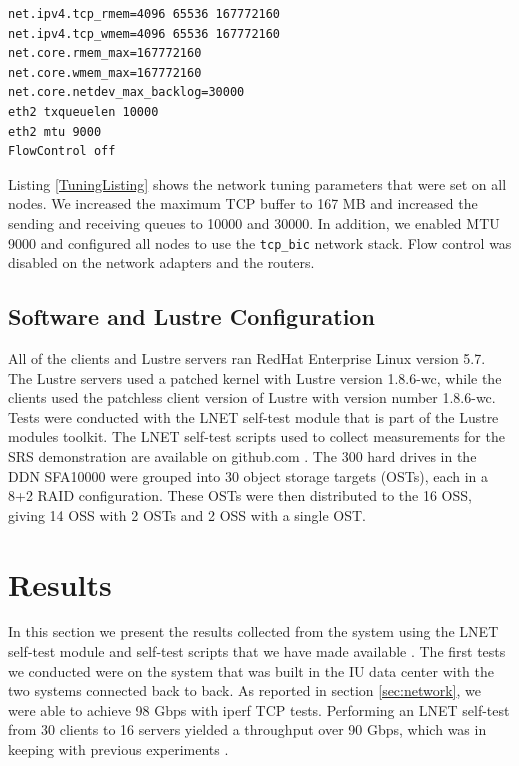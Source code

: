 \documentclass[]{sig-alternate}
\begin{document}
\lstset{language=Bash, caption=Tuning parameters for the network, label=TuningListing}
\begin{lstlisting}
net.ipv4.tcp_rmem=4096 65536 167772160
net.ipv4.tcp_wmem=4096 65536 167772160
net.core.rmem_max=167772160
net.core.wmem_max=167772160
net.core.netdev_max_backlog=30000
eth2 txqueuelen 10000
eth2 mtu 9000
FlowControl off 
\end{lstlisting}

Listing \ref{TuningListing} shows the network tuning parameters that were set on all nodes. We increased the maximum TCP buffer to 167 MB and increased the sending and receiving queues to 10000 and 30000. In addition, we enabled MTU 9000 and configured all nodes to use the \texttt{tcp\_bic} network stack. Flow control was disabled on the network adapters and the routers.

\vfill\eject
\subsection{Software and Lustre Configuration}

All of the clients and Lustre servers ran RedHat Enterprise Linux version 5.7. The Lustre servers used a
patched kernel with Lustre version 1.8.6-wc, while the clients used the patchless client version of Lustre with
version number 1.8.6-wc. Tests were conducted with the LNET self-test module that is part of the Lustre modules
toolkit. The LNET self-test scripts used to collect measurements for the SRS demonstration are available on
github.com \cite{lstgithub2011}. The 300 hard drives in the DDN SFA10000 were grouped into 30 object storage
targets (OSTs), each in a 8+2 RAID configuration. These OSTs were then distributed to the 16 OSS, giving 14
OSS with 2 OSTs and 2 OSS with a single OST.

\section{Results}\label{sec:results}

In this section we present the results collected from the system using the LNET self-test module and self-test
scripts that we have made available \cite{lstgithub2011}. The first tests we conducted were on the system that
was built in the IU data center with the two systems connected back to back. As reported in section
\ref{sec:network}, we were able to achieve 98 Gbps with iperf TCP tests. Performing an LNET self-test from 30
clients to 16 servers yielded a throughput over 90 Gbps, which was in keeping with previous experiments
\cite{kluge2012}.
\end{document}
